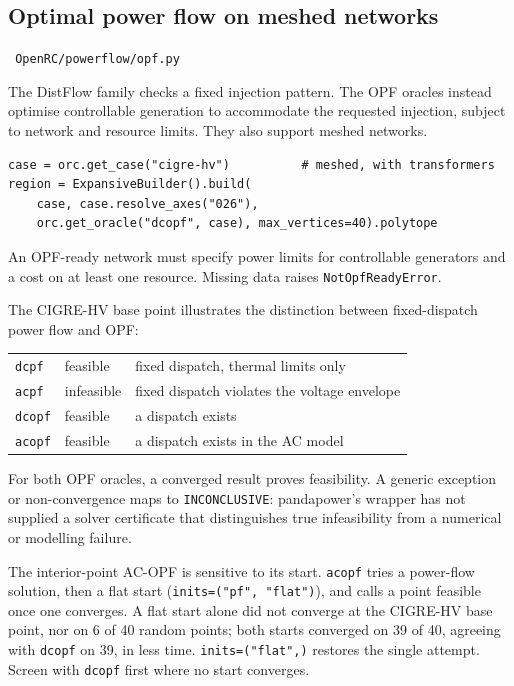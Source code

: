\documentclass[11pt,a4paper]{report}
\newcommand{\why}[1]{\par\medskip\begingroup\noindent #1\par\endgroup\medskip}
\newcommand{\trap}[1]{\begin{warnbox}#1\end{warnbox}}
\newcommand{\code}[1]{\texttt{\small #1}}
\newcommand{\file}[1]{\texttt{\small\color{nbgrey} #1}}
\begin{document}
\subsection{Optimal power flow on meshed networks}
\label{sec:opf}

\file{OpenRC/powerflow/opf.py}

The DistFlow family checks a fixed injection pattern. The OPF oracles instead
optimise controllable generation to accommodate the requested injection,
subject to network and resource limits. They also support meshed networks.

\begin{lstlisting}
case = orc.get_case("cigre-hv")          # meshed, with transformers
region = ExpansiveBuilder().build(
    case, case.resolve_axes("026"),
    orc.get_oracle("dcopf", case), max_vertices=40).polytope
\end{lstlisting}

An OPF-ready network must specify power limits for controllable generators and
a cost on at least one resource. Missing data raises \code{NotOpfReadyError}.

The CIGRE-HV base point illustrates the distinction between fixed-dispatch
power flow and OPF:

\begin{center}\small
\begin{tabular}{@{}lll@{}}
\toprule
\code{dcpf}  & feasible     & fixed dispatch, thermal limits only \\
\code{acpf}  & infeasible   & fixed dispatch violates the voltage envelope \\
\code{dcopf} & feasible     & a dispatch exists \\
\code{acopf} & feasible     & a dispatch exists in the AC model \\
\bottomrule
\end{tabular}
\end{center}

\why{For both OPF oracles, a converged result proves feasibility. A generic
exception or non-convergence maps to \code{INCONCLUSIVE}: pandapower's wrapper
has not supplied a solver certificate that distinguishes true infeasibility
from a numerical or modelling failure.}

\trap{The interior-point AC-OPF is sensitive to its start. \code{acopf} tries a
power-flow solution, then a flat start (\code{inits=("pf", "flat")}), and calls a
point feasible once one converges. A flat start alone did not converge at the
CIGRE-HV base point, nor on 6 of 40 random points; both starts converged on 39
of 40, agreeing with \code{dcopf} on 39, in less time. \code{inits=("flat",)}
restores the single attempt. Screen with \code{dcopf} first where no start
converges.}
\end{document}
